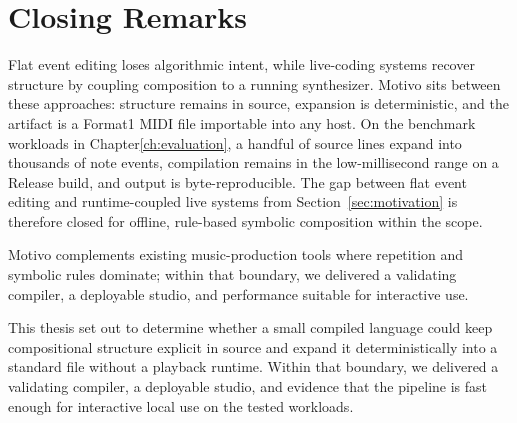 \section{Closing Remarks}\label{sec:closing}

Flat event editing loses algorithmic intent, while live-coding systems recover structure by coupling
composition to a running synthesizer.
Motivo sits between these approaches: structure remains in source, expansion is deterministic, and the
artifact is a Format1 MIDI file importable into any host.
On the benchmark workloads in Chapter\ref{ch:evaluation}, a handful of source lines expand into thousands of
note events, compilation remains in the low-millisecond range on a Release build, and output is byte-reproducible.
The gap between flat event editing and runtime-coupled live systems from Section~\ref{sec:motivation} is
therefore closed for offline, rule-based symbolic composition within the scope.

Motivo complements existing music-production tools where repetition and symbolic rules dominate; within that
boundary, we delivered a validating compiler, a deployable studio, and performance suitable for interactive use.

This thesis set out to determine whether a small compiled language could keep compositional structure
explicit in source and expand it deterministically into a standard file without a playback runtime.
Within that boundary, we delivered a validating compiler, a deployable studio, and evidence that the pipeline is fast
enough for interactive local use on the tested workloads.
